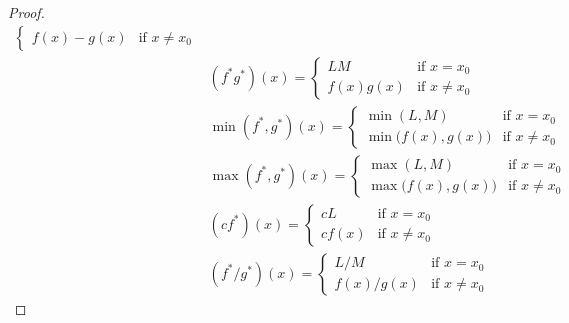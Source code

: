 \begin{proof}
\begin{align*}
\begin{cases}
                                                       f(x) - g(x) & \text{if } x \neq x_0
                                                     \end{cases}                    \\
                                  & (f^* g^*)(x) = \begin{cases}
                                                     LM        & \text{if } x = x_0    \\
                                                     f(x) g(x) & \text{if } x \neq x_0
                                                   \end{cases}                        \\
                                  & \min(f^*, g^*)(x) = \begin{cases}
                                                          \min(L, M)               & \text{if } x = x_0    \\
                                                          \min\big(f(x), g(x)\big) & \text{if } x \neq x_0
                                                        \end{cases}    \\
                                  & \max(f^*, g^*)(x) = \begin{cases}
                                                          \max(L, M)               & \text{if } x = x_0    \\
                                                          \max\big(f(x), g(x)\big) & \text{if } x \neq x_0
                                                        \end{cases}    \\
                                  & (c f^*)(x) = \begin{cases}
                                                   cL     & \text{if } x = x_0    \\
                                                   c f(x) & \text{if } x \neq x_0
                                                 \end{cases}                             \\
                                  & (f^* / g^*)(x) = \begin{cases}
                                                       L / M       & \text{if } x = x_0    \\
                                                       f(x) / g(x) & \text{if } x \neq x_0

\end{cases}
\end{align*}
\end{proof}
